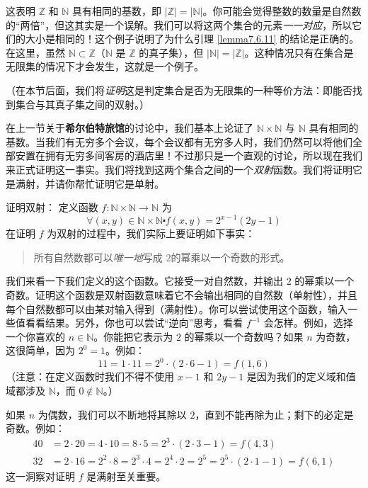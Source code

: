 这表明 $\mathbb{Z}$ 和 $\mathbb{N}$ 具有相同的基数，即 $|\mathbb{Z}| = |\mathbb{N}|$。你可能会觉得整数的数量是自然数的``两倍''，但这其实是一个误解。我们可以将这两个集合的元素\emph{一一对应}，所以它们的大小是相同的！这个例子说明了为什么引理 \ref{lemma7.6.11} 的结论是正确的。在这里，虽然 $\mathbb{N} \subset \mathbb{Z}$（$\mathbb{N}$ 是 $\mathbb{Z}$ 的真子集），但 $|\mathbb{N}| = |\mathbb{Z}|$。这种情况只有在集合是无限集的情况下才会发生，这就是一个例子。

（在本节后面，我们将\emph{证明}这是判定集合是否为无限集的一种等价方法：即能否找到集合与其真子集之间的双射。）\\

\begin{example}\label{ex:example7.6.13}

    在上一节关于\textbf{希尔伯特旅馆}的讨论中，我们基本上论证了 $\mathbb{N} \times \mathbb{N}$ 与 $\mathbb{N}$ 具有相同的基数。当我们有无穷多个会议，每个会议都有无穷多人时，我们仍然可以将他们全部安置在拥有无穷多间客房的酒店里！不过那只是一个直观的讨论，所以现在我们来正式证明这一事实。我们将找到这两个集合之间的一个\emph{双射}函数。我们将证明它是满射，并请你帮忙证明它是单射。

    \begin{proofs}{证明双射：}
        定义函数 $f : \mathbb{N} \times \mathbb{N} \to \mathbb{N}$ 为
        \[\forall (x, y) \in \mathbb{N} \times \mathbb{N} \centerdot f(x, y) = 2^{x-1}(2y - 1)\]
        在证明 $f$ 为双射的过程中，我们实际上要证明如下事实：
        \begin{quotation}
            所有自然数都可以\emph{唯一地}写成 $2$的幂乘以一个奇数的形式。
        \end{quotation}
        我们来看一下我们定义的这个函数。它接受一对自然数，并输出 $2$ 的幂乘以一个奇数。证明这个函数是双射函数意味着它不会输出相同的自然数（单射性），并且每个自然数都可以由某对输入得到（满射性）。你可以尝试使用这个函数，输入一些值看看结果。另外，你也可以尝试``逆向''思考，看看 $f^{-1}$ 会怎样。例如，选择一个你喜欢的 $n \in \mathbb{N}$。你能把它表示为 $2$ 的幂乘以一个奇数吗？如果 $n$ 为奇数，这很简单，因为 $2^0 = 1$。例如：
        \[11 = 1 \cdot 11 = 2^0 \cdot (2 \cdot 6 - 1) = f(1, 6)\]
        （注意：在定义函数时我们不得不使用 $x - 1$ 和 $2y - 1$ 是因为我们的定义域和值域都涉及 $\mathbb{N}$，而 $0 \notin \mathbb{N}$。）

        如果 $n$ 为偶数，我们可以不断地将其除以 $2$，直到不能再除为止；剩下的必定是奇数。例如：
        \begin{align*}
            40 & = 2 \cdot 20 = 4 \cdot 10 = 8 \cdot 5 = 2^3 \cdot (2 \cdot 3 - 1) = f(4, 3)                        \\
            32 & = 2 \cdot 16 = 2^2 \cdot 8 = 2^3 \cdot 4 = 2^4 \cdot 2 = 2^5 = 2^5 \cdot (2 \cdot 1 - 1) = f(6, 1)
        \end{align*}
        这一洞察对证明 $f$ 是满射至关重要。\\


\end{proofs}
\end{example}
